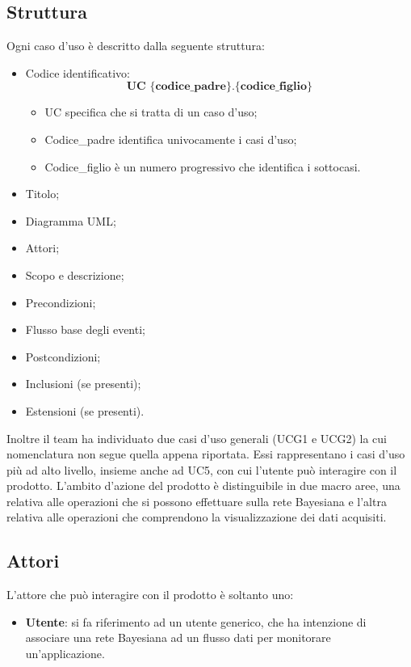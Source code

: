 \subsection{Struttura}
Ogni caso d'uso è descritto dalla seguente struttura:
\begin{itemize}
	\item Codice identificativo: $$ \textbf{UC \{codice\_padre\}.\{codice\_figlio\}  } $$
	\begin{itemize}
		\item UC specifica che si tratta di un caso d'uso;
		\item Codice\_padre identifica univocamente i casi d'uso;
		\item Codice\_figlio è un numero progressivo che identifica i sottocasi.
	\end{itemize}
	\item Titolo;
	\item Diagramma UML;
	\item Attori;
	\item Scopo e descrizione;
	\item Precondizioni;
	\item Flusso base degli eventi;
	\item Postcondizioni;
	\item Inclusioni (se presenti);
	\item Estensioni (se presenti).
\end{itemize}
\Spazio
Inoltre il team ha individuato due casi d'uso generali (UCG1 e UCG2) la cui nomenclatura non segue quella appena riportata. Essi rappresentano i casi d'uso più ad alto livello, insieme anche ad UC5, con cui l'utente può interagire con il prodotto.
L'ambito d'azione del prodotto è distinguibile in due macro aree, una relativa alle operazioni che si possono effettuare sulla rete Bayesiana e l'altra relativa alle operazioni che comprendono la visualizzazione dei dati acquisiti.

\subsection{Attori}
L'attore che può interagire con il prodotto è soltanto uno:
\begin{itemize}
	\item \textbf{Utente}: si fa riferimento ad un utente generico, che ha intenzione di associare una rete Bayesiana ad un flusso dati per monitorare un'applicazione.
\end{itemize}

